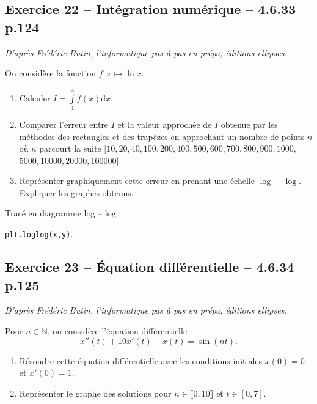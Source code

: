 \documentclass[10pt,fleqn]{article} %
\begin{document}
\begin{multicols}{2}
\subsection*{Exercice 22 -- Intégration numérique -- 4.6.33 p.124}
\begin{flushright}
\textit{D'après Frédéric Butin, l'informatique pas à pas en prépa, éditions ellipses.}
\end{flushright}

On considère la fonction $f:x \mapsto \ln x$.
\begin{enumerate}
\item Calculer $I=\int\limits_1^4 f(x) \text{d}x$.
\item Comparer l'erreur entre $I$ et la valeur approchée de $I$ obtenue par les méthodes des rectangles et des trapèzes en approchant un nombre de points $n$ où $n$ parcourt la suite $[10,20,40,100,200, 400, 500, 600, 700, 800, 900, 1000,$ $5000, 10000, 20000, 100000]$.
\item Représenter graphiquement cette erreur en prenant une échelle $\log$ -- $\log$. Expliquer les graphes obtenus.
\end{enumerate}

\begin{rem}
Tracé en diagramme log -- log :

\texttt{plt.loglog(x,y)}.
\end{rem}

\subsection*{Exercice 23 -- Équation différentielle -- 4.6.34 p.125}
\begin{flushright}
\textit{D'après Frédéric Butin, l'informatique pas à pas en prépa, éditions ellipses.}
\end{flushright}

Pour $n \in \mathbb{N}$, on considère l'équation différentielle : 
$$
x''(t) +10 x'(t) - x(t)=\sin \left( nt \right).
$$
\begin{enumerate}
\item Résoudre cette équation différentielle avec les conditions initiales $x(0)=0$ et $x'(0)=1$.
\item Représenter le graphe des solutions pour $n\in \llbracket 0,10 \rrbracket$ et $t \in[0,7]$.
\end{enumerate}


\end{multicols}
\end{document}
